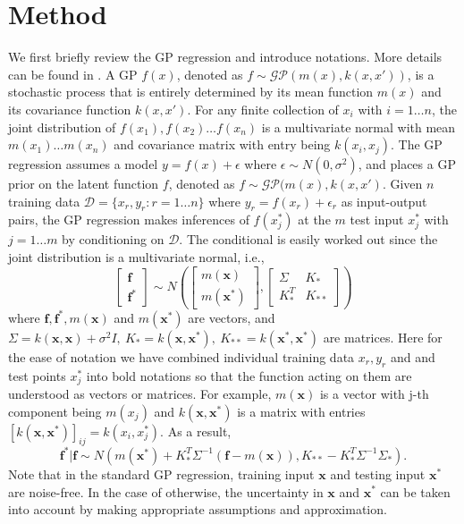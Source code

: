 \documentclass[11pt, reqno]{amsart}
\begin{document}
\section{Method} \label{sec:GP-method}
We first briefly review the GP regression and introduce notations. More details can be found in \citep{Rasmussen2006}. A GP $f(x)$, denoted as $f\sim\mathcal{GP}(m(x),k(x,x'))$, is a stochastic process that is entirely determined by its mean function $m(x)$ and its covariance function $k(x,x')$. For any finite collection of $x_{i}$ with $i=1\ldots n$, the joint distribution of $f(x_{1}),f(x_{2})\ldots f(x_{n})$ is a multivariate normal with mean $m(x_{1})\ldots m(x_{n})$ and covariance matrix with entry being $k(x_{i},x_{j})$. The GP regression assumes a model $y=f(x)+\epsilon$ where $\epsilon\sim N(0,\sigma^{2})$, and places a GP prior on the latent function $f$, denoted as $f\sim\mathcal{GP}(m(x),k(x,x')$. Given $n$ training data $\mathcal{D}=\{x_{r},y_{r}:r=1\ldots n\}$ where $y_{r}=f(x_{r})+\epsilon_{r}$ as input-output pairs, the GP regression makes inferences of $f(x_{j}^{*})$ at the $m$ test input $x_{j}^{*}$ with $j=1\ldots m$ by conditioning on $\mathcal{D}$. The conditional is easily worked out since the joint distribution is a multivariate normal, i.e., 
\[
\begin{bmatrix}\mathbf{f}\\
\mathbf{f}^{*}
\end{bmatrix}\sim N(\begin{bmatrix}m(\mathbf{x})\\
m(\mathbf{x}^{*})
\end{bmatrix},\begin{bmatrix}\Sigma & K_{*}\\
K_{*}^{T} & K_{**}
\end{bmatrix})
\]
where $\mathbf{f},\mathbf{f}^{*},m(\mathbf{x})$ and $m(\mathbf{x}^{*})$ are vectors, and $\Sigma=k(\mathbf{x},\mathbf{x})+\sigma^{2}I,\ K_{*}=k(\mathbf{x},\mathbf{x}^{*}),\ K_{**}=k(\mathbf{x}^{*},\mathbf{x}^{*})$ are matrices. Here for the ease of notation we have combined individual training data $x_{r},y_{r}$ and and test points $x_{j}^{*}$ into bold notations so that the function acting on them are understood as vectors or matrices. For example, $m(\mathbf{x})$ is a vector with j-th component being $m(x_{j})$ and $k(\mathbf{x},\mathbf{x}^{*})$ is a matrix with entries $[k(\mathbf{x},\mathbf{x}^{*})]_{ij}=k(x_{i},x_{j}^{*})$. As a result, 
\begin{equation}
\mathbf{f}^{*}\vert\mathbf{f}\sim N(m(\mathbf{x}^{*})+K_{*}^{T}\Sigma^{-1}(\mathbf{f}-m(\mathbf{x})),K_{**}-K_{*}^{T}\Sigma^{-1}\Sigma_{*}). \label{eq:f|f*}
\end{equation}
Note that in the standard GP regression, training input $\mathbf{x}$ and testing input $\mathbf{x}^{*}$ are noise-free. In the case of otherwise, the uncertainty in $\mathbf{x}$ and $\mathbf{x}^{*}$ can be taken into account by making appropriate assumptions and approximation. 
\end{document}
